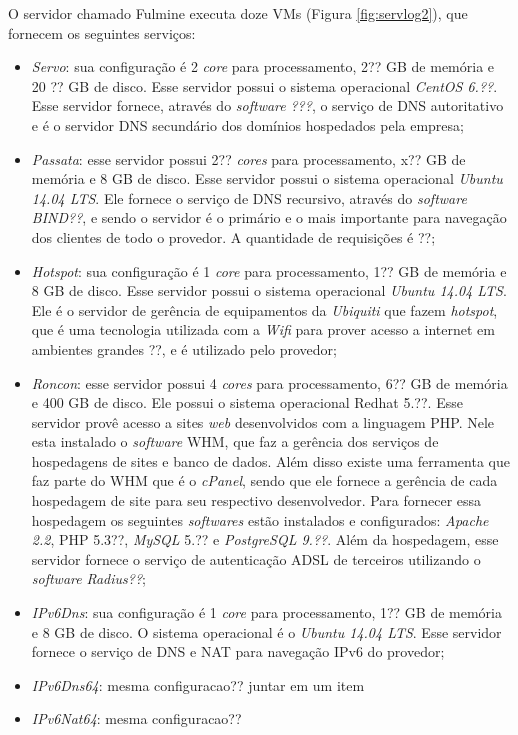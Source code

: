 O servidor chamado Fulmine executa doze \ac{VM}s (Figura \ref{fig:servlog2}), que fornecem os seguintes serviços:
\begin{itemize}
 \item \textit{Servo}: sua configuração é 2 \textit{core} para processamento, 2?? GB de memória e 20 ?? GB de disco. Esse servidor possui o 
 sistema operacional \textit{CentOS 6.??}. Esse servidor fornece, através do \textit{software} \textit{???}, o serviço de \ac{DNS} autoritativo 
 e é o servidor \ac{DNS} secundário dos domínios hospedados pela empresa;
 
 \item \textit{Passata}: esse servidor possui 2?? \textit{cores} para processamento, x?? GB de memória e 8 GB de disco. Esse servidor possui o 
 sistema operacional \textit{Ubuntu 14.04 \ac{LTS}}. Ele fornece o serviço de \ac{DNS} recursivo, através do \textit{software} \textit{BIND??}, 
 e sendo o servidor é o primário e o mais importante para navegação dos clientes de todo o provedor. A quantidade de requisições é ??;
 
 \item \textit{Hotspot}: sua configuração é 1 \textit{core} para processamento, 1?? GB de memória e 8 GB de disco. Esse servidor possui o 
 sistema operacional \textit{Ubuntu 14.04 \ac{LTS}}. Ele é o servidor de gerência de equipamentos da \textit{Ubiquiti} que fazem \textit{hotspot}, 
 que é uma tecnologia utilizada com a \textit{Wifi} para prover acesso a internet em ambientes grandes ??, e é utilizado pelo provedor;
 
 \item \textit{Roncon}: esse servidor possui 4 \textit{cores} para processamento, 6?? GB de memória e 400 GB de disco. Ele possui o sistema
 operacional Redhat 5.??. Esse servidor provê acesso a sites \textit{web} desenvolvidos com a linguagem \ac{PHP}. Nele esta instalado o 
 \textit{software} \ac{WHM}, que faz a gerência dos serviços de hospedagens de sites e banco de dados. Além disso existe uma ferramenta que 
 faz parte do \ac{WHM} que é o \textit{cPanel}, sendo que ele fornece a gerência de cada hospedagem de site para seu respectivo desenvolvedor.
 Para fornecer essa hospedagem os seguintes \textit{softwares} estão instalados e configurados: \textit{Apache 2.2}, \ac{PHP} 5.3??, 
 \textit{MySQL} 5.?? e \textit{PostgreSQL 9.??}.
 Além da hospedagem, esse servidor fornece o serviço de autenticação \ac{ADSL} de terceiros utilizando o \textit{software} \textit{Radius??};
 
 \item \textit{IPv6Dns}: sua configuração é 1 \textit{core} para processamento, 1?? GB de memória e 8 GB de disco. O sistema operacional é o 
 \textit{Ubuntu 14.04 \ac{LTS}}. Esse servidor fornece o serviço de \ac{DNS} e \ac{NAT} para navegação \ac{IPv6} do provedor;
 \item \textit{IPv6Dns64}: mesma configuracao?? juntar em um item
 \item \textit{IPv6Nat64}: mesma configuracao??
 

\end{itemize}
